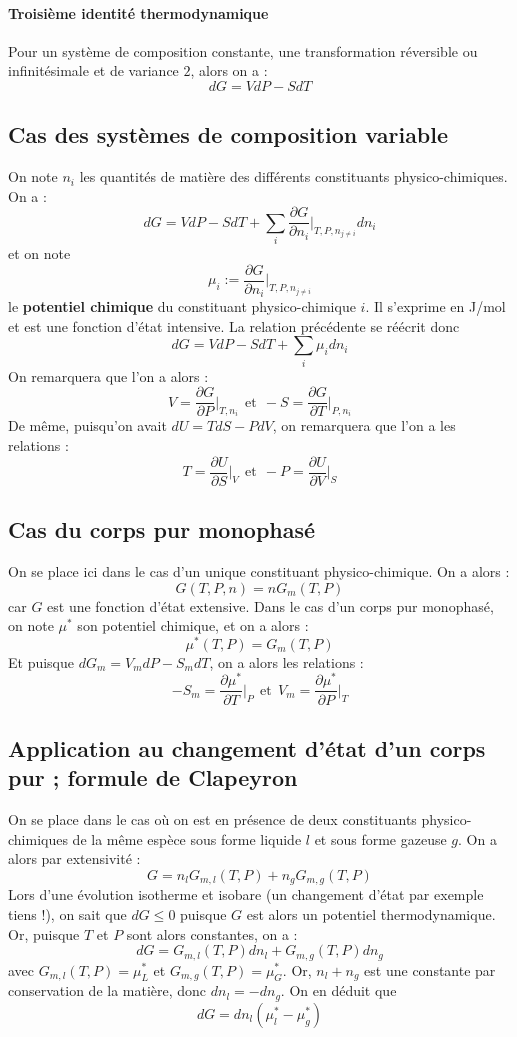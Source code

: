 \documentclass[french]{book}
\theoremstyle{plain}
\theoremstyle{definition}
\theoremstyle{remark}
\newcommand{\st}{^*}
\begin{document}
\paragraph{Troisième identité thermodynamique} Pour un système de composition constante, une transformation réversible ou infinitésimale et de variance $2$, alors on a : $$dG=VdP-SdT$$
\subsection{Cas des systèmes de composition variable}
On note $n_i$ les quantités de matière des différents constituants physico-chimiques. On a : $$dG=VdP-SdT+\sum_i \frac{\partial G}{\partial n_i}\bigg|_{T,P,n_{j\ne i}}dn_i$$ et on note $$\mu_i:=\frac{\partial G}{\partial n_i}\bigg|_{T,P,n_{j\ne i}}$$ le \textbf{potentiel chimique} du constituant physico-chimique $i$. Il s'exprime en J/mol et est une fonction d'état intensive. La relation précédente se réécrit donc $$dG=VdP-SdT+\sum_i \mu_i dn_i$$ On remarquera que l'on a alors : $$V=\frac{\partial G}{\partial P}\bigg|_{T,n_i} \ \ \text{et}\ \ -S=\frac{\partial G}{\partial T}\bigg|_{P,n_i}$$ De même, puisqu'on avait $dU=TdS-PdV$, on remarquera que l'on a les relations : $$T=\frac{\partial U}{\partial S}\bigg|_V \ \ \text{et} \ \ -P=\frac{\partial U}{\partial V}\bigg|_S$$
\subsection{Cas du corps pur monophasé}
On se place ici dans le cas d'un unique constituant physico-chimique. On a alors : $$G(T,P,n)=nG_m(T,P)$$ car $G$ est une fonction d'état extensive. Dans le cas d'un corps pur monophasé, on note $\mu\st$ son potentiel chimique, et on a alors : $$\mu\st(T,P)=G_m(T,P)$$ Et puisque $dG_m=V_mdP-S_mdT$, on a alors les relations : $$-S_m=\frac{\partial \mu\st}{\partial T}\bigg|_P \ \ \text{et}\ \ V_m=\frac{\partial \mu\st}{\partial P}\bigg|_T$$
\subsection{Application au changement d'état d'un corps pur ; formule de Clapeyron}
On se place dans le cas où on est en présence de deux constituants physico-chimiques de la même espèce sous forme liquide $l$ et sous forme gazeuse $g$. On a alors par extensivité : $$G=n_lG_{m,l}(T,P)+n_gG_{m,g}(T,P)$$ Lors d'une évolution isotherme et isobare (un changement d'état par exemple tiens !), on sait que $dG\leqslant 0$ puisque $G$ est alors un potentiel thermodynamique. Or, puisque $T$ et $P$ sont alors constantes, on a : $$dG=G_{m,l}(T,P)dn_l+G_{m,g}(T,P)dn_g$$ avec $G_{m,l}(T,P)=\mu_L\st$ et $G_{m,g}(T,P)=\mu_G\st$. Or, $n_l+n_g$ est une constante par conservation de la matière, donc $dn_l=-dn_g$. On en déduit que $$dG=dn_l(\mu_l\st-\mu_g\st)$$
\end{document}
